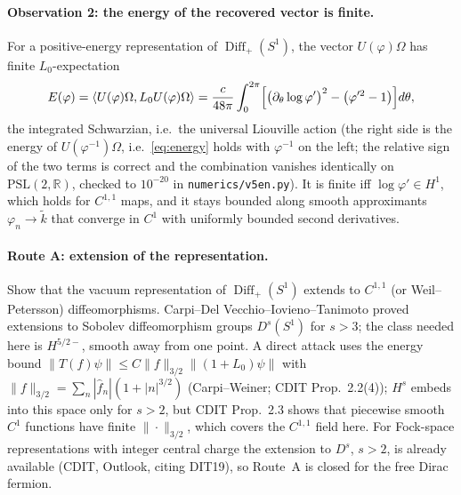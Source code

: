 \documentclass[11pt]{article}
\theoremstyle{accent}
\theoremstyle{definition}
\newcommand{\Diff}{\operatorname{Diff}}
\begin{document}
\paragraph{Observation 2: the energy of the recovered vector is finite.}
For a positive-energy representation of \(\Diff_+(S^1)\), the vector \(U(\varphi)\Omega\) has finite \(L_0\)-expectation
\begin{equation}\label{eq:energy}
 E(\varphi)=\langle U(\varphi)\Omega,L_0U(\varphi)\Omega\rangle
 =\frac{c}{48\pi}\int_0^{2\pi}\Bigl[\bigl(\partial_\theta\log\varphi'\bigr)^2-\bigl(\varphi'^2-1\bigr)\Bigr]d\theta,
\end{equation}
the integrated Schwarzian, i.e.\ the universal Liouville action (the right side is the energy of \(U(\varphi^{-1})\Omega\), i.e.\ \eqref{eq:energy} holds with \(\varphi^{-1}\) on the left; the relative sign of the two terms is correct and the combination vanishes identically on \(\mathrm{PSL}(2,\mathbb R)\), checked to \(10^{-20}\) in \texttt{numerics/v5en.py}).  It is finite iff \(\log\varphi'\in H^1\), which holds for \(C^{1,1}\) maps, and it stays bounded along smooth approximants \(\varphi_n\to\widetilde k\) that converge in \(C^1\) with uniformly bounded second derivatives.

\paragraph{Route A: extension of the representation.}
Show that the vacuum representation of \(\Diff_+(S^1)\) extends to \(C^{1,1}\) (or Weil--Petersson) diffeomorphisms.  Carpi--Del Vecchio--Iovieno--Tanimoto proved extensions to Sobolev diffeomorphism groups \(D^s(S^1)\) for \(s>3\); the class needed here is \(H^{5/2-}\), smooth away from one point.  A direct attack uses the energy bound \(\|T(f)\psi\|\le C\|f\|_{3/2}\|(1+L_0)\psi\|\) with \(\|f\|_{3/2}=\sum_n|\hat f_n|(1+|n|^{3/2})\) (Carpi--Weiner; CDIT Prop.~2.2(4)); \(H^s\) embeds into this space only for \(s>2\), but CDIT Prop.~2.3 shows that piecewise smooth \(C^1\) functions have finite \(\|\cdot\|_{3/2}\), which covers the \(C^{1,1}\) field here.  For Fock-space representations with integer central charge the extension to \(D^s\), \(s>2\), is already available (CDIT, Outlook, citing DIT19), so Route~A is closed for the free Dirac fermion.
\end{document}
